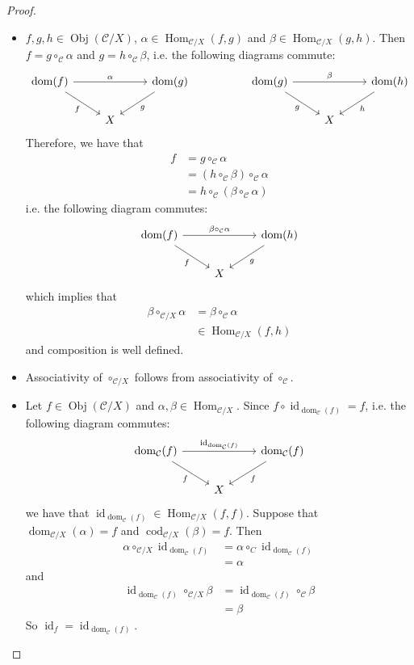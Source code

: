 \documentclass{book}
\theoremstyle{definition}
\newcommand{\al}{\alpha}
\newcommand{\be}{\beta}
\newcommand{\MC}{\mathcal{C}}
\DeclareMathOperator{\id}{id}
\DeclareMathOperator{\dom}{dom}
\DeclareMathOperator{\cod}{cod}
\DeclareMathOperator{\Obj}{Obj}
\DeclareMathOperator{\Hom}{Hom}
\DeclareMathOperator*{\0}{\mbf{0}}
\DeclareMathOperator*{\1}{\mbf{1}}
\begin{document}
	\begin{proof}\
		\begin{itemize}
			\item $f,g, h \in \Obj(\MC / X)$, $\al \in \Hom_{\MC / X}(f, g)$ and $\be \in \Hom_{\MC / X}(g, h)$. Then $f = g \circ_{\MC} \al$ and $g = h \circ_{\MC} \be$, i.e. the following diagrams commute:
			\[ \begin{tikzcd}
				\dom(f) \arrow[rr, "\al"] \arrow[dr, "f"'] 	
				&& \dom(g)  \arrow[dl, "g"]  
				&& \dom(g) \arrow[rr, "\be"] \arrow[dr, "g"'] 	
				&& \dom(h)  \arrow[dl, "h"]\\
				& X 
				&& &&X
			\end{tikzcd}
			\]
			Therefore, we have that 
			\begin{align*}
				f 
				& = g \circ_{\MC} \al \\
				& = (h \circ_{\MC} \be) \circ_{\MC} \al \\
				&= h \circ_{\MC} (\be \circ_{\MC} \al) 
			\end{align*}
			i.e. the following diagram commutes:
			\[ 
			\begin{tikzcd}
				\dom(f) \arrow[rr, "\be \circ_{\MC} \al"] \arrow[dr, "f"'] 	
				& & \dom(h)  \arrow[dl, "g"] \\
				& X 
			\end{tikzcd}
			\]
			which implies that 
			\begin{align*}
				\be \circ_{\MC / X} \al 
				& = \be \circ_{\MC} \al \\
				& \in \Hom_{\MC / X}(f, h)
			\end{align*}
			and composition is well defined. 
			\item Associativity of $\circ_{\MC / X}$ follows from associativity of $\circ_\MC$.
			\item Let $f \in \Obj(\MC / X)$ and $\al, \be \in \Hom_{\MC / X}$. Since $f \circ \id_{\dom_{\MC}(f)} = f$, i.e. the following diagram commutes: 
			\[ \begin{tikzcd}
				\dom_{\MC}(f) \arrow[rr, "\id_{\dom_{\MC}(f)}"] \arrow[dr, "f"'] 	
				& & \dom_{\MC}(f)  \arrow[dl, "f"] \\
				& X 
			\end{tikzcd}
			\]
			we have that $\id_{\dom_{\MC}(f)} \in \Hom_{\MC / X}(f, f)$.
			Suppose that $\dom_{\MC / X}(\al) = f$ and $\cod_{\MC /X}(\be) = f$. Then 
			\begin{align*}
				\al \circ_{\MC /X} \id_{\dom_{\MC}(f)}
				&= \al \circ_{C} \id_{\dom_{\MC}(f)} \\
				&= \al
			\end{align*}
			and 
			\begin{align*}
				\id_{\dom_{\MC}(f)} \circ_{\MC /X} \be
				&= \id_{\dom_{\MC}(f)} \circ_{\MC} \be \\
				&= \be
			\end{align*}
			So $\id_f = \id_{\dom_{\MC}(f)}$.
		\end{itemize}
	\end{proof}
\end{document}
